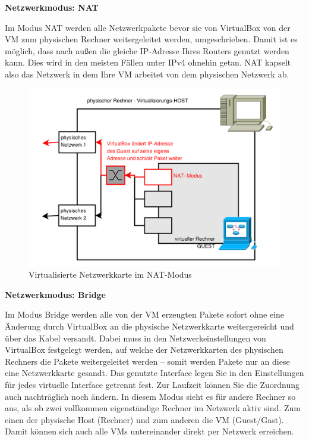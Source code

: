 \documentclass[paper=a4,fontsize=11pt]{scrartcl}%
\numberwithin{equation}{section}
\begin{document}
\begin{center}
\Large{\textbf{Netzwerkmodus: NAT}}
\end{center}
Im Modus NAT werden alle Netzwerkpakete bevor sie von VirtualBox von der VM zum physischen Rechner weitergeleitet werden, umgeschrieben. Damit ist es möglich, dass nach außen die gleiche IP-Adresse Ihres Routers genutzt werden kann. Dies wird in den meisten Fällen unter IPv4 ohnehin getan. NAT kapselt also das Netzwerk in dem Ihre VM arbeitet von dem physischen Netzwerk ab.
\begin{figure}[H]
\centering
\includegraphics[scale=0.35]{vbox5}
\caption{Virtualisierte Netzwerkkarte im NAT-Modus}
\end{figure}
\begin{center}
\Large{\textbf{Netzwerkmodus: Bridge}}
\end{center}
Im Modus Bridge werden alle von der VM erzeugten Pakete sofort ohne eine Änderung durch VirtualBox an die physische Netzwerkkarte weitergereicht und über das Kabel versandt. Dabei muss in den Netzwerkeinstellungen von VirtualBox festgelegt werden, auf welche der Netzwerkkarten des physischen Rechners die Pakete weitergeleitet werden -- somit werden Pakete nur an diese eine Netzwerkkarte gesandt. Das genutzte Interface legen Sie in den Einstellungen für jedes virtuelle Interface getrennt fest. Zur Laufzeit können Sie die Zuordnung auch nachträglich noch ändern. In diesem Modus sieht es für andere Rechner so aus, als ob zwei vollkommen eigenständige Rechner im Netzwerk aktiv sind. Zum einen der physische Host (Rechner) und zum anderen die VM (Guest/Gast). Damit können sich auch alle VMs untereinander direkt per Netzwerk erreichen.
\end{document}
